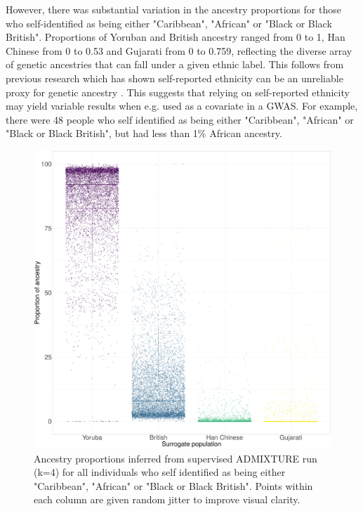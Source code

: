 However, there was substantial variation in the ancestry proportions for those who self-identified as being either "Caribbean", "African" or "Black or Black British". Proportions of Yoruban and British ancestry ranged from 0 to 1, Han Chinese from 0 to 0.53 and Gujarati from 0 to 0.759, reflecting the diverse array of genetic ancestries that can fall under a given ethnic label. This follows from previous research which has shown self-reported ethnicity can be an unreliable proxy for genetic ancestry \cite{shraga2017evaluating, LouwersSelfReportedEthnicity2014}. This suggests that relying on self-reported ethnicity may yield variable results when e.g. used as a covariate in a GWAS. For example, there were 48 people who self identified as being either "Caribbean", "African" or "Black or Black British", but had less than 1\% African ancestry.

\begin{figure}[htp]
    \centering
    \includegraphics[width=1.0\textwidth]{../images/chapter3/African_Inds_proportions.pdf}
    \caption{Ancestry proportions inferred from supervised ADMIXTURE run (k=4) for all individuals who self identified as being either "Caribbean", "African" or "Black or Black British". Points within each column are given random jitter to improve visual clarity.}
    \label{fig:African_Inds_proportions_ADMIXTURE}
\end{figure}


